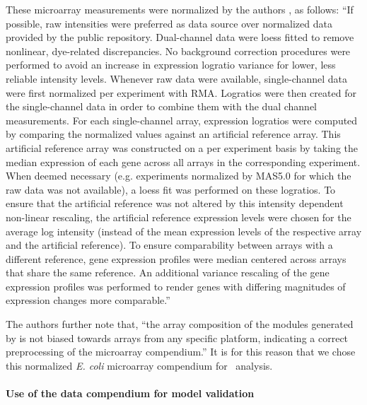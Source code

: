 
These microarray measurements were normalized by the
authors \cite{Lemmens2009a}, as follows: ``If possible, raw
intensities were preferred as data source over normalized data
provided by the public repository. Dual-channel data were loess fitted
to remove nonlinear, dye-related discrepancies. No background
correction procedures were performed to avoid an increase in
expression logratio variance for lower, less reliable intensity
levels. Whenever raw data were available, single-channel data were
first normalized per experiment with RMA. Logratios were then
created for the single-channel data in order to combine them with the
dual channel measurements. For each single-channel array, expression
logratios were computed by comparing the normalized values against an
artificial reference array.  This artificial reference array was
constructed on a per experiment basis by taking the median expression
of each gene across all arrays in the corresponding experiment. When
deemed necessary (e.g. experiments normalized by MAS5.0 for which the
raw data was not available), a loess fit was performed on these
logratios. To ensure that the artificial reference was not altered by
this intensity dependent non-linear rescaling, the artificial
reference expression levels were chosen for the average log intensity
(instead of the mean expression levels of the respective array and the
artificial reference). To ensure comparability between arrays with a
different reference, gene expression profiles were median centered
across arrays that share the same reference. An additional variance
rescaling of the gene expression profiles was performed to render
genes with differing magnitudes of expression changes more
comparable.''

The authors further note that,
``the array composition of the modules generated by 
is not biased towards arrays from any specific platform, indicating a
correct preprocessing of the microarray compendium.'' \cite{Lemmens2009a} It is for this
reason that we chose this normalized {\it
E. coli} microarray compendium for \egrine~analysis.

\paragraph{Use of the  data compendium for model validation}
\label{section:dream5_data_compendium}

